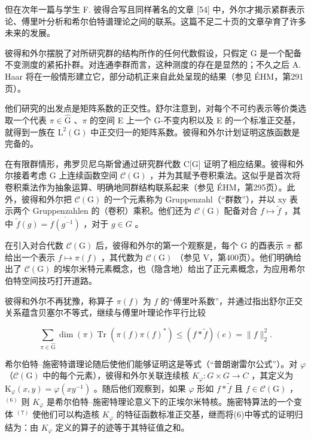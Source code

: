 但在次年一篇与学生 F. 彼得合写且同样著名的文章 {[}54{]} 中，外尔才揭示紧群表示论、傅里叶分析和希尔伯特谱理论之间的联系。这篇不足二十页的文章孕育了许多未来的发展。

彼得和外尔摆脱了对所研究群的结构所作的任何代数假设，只假定 G 是一个配备不变测度的紧拓扑群。对连通李群而言，这种测度的存在是显然的；不久之后 A. Haar 将在一般情形建立它，部分动机正来自此处呈现的结果（参见 ÉHM，第291页）。

他们研究的出发点是矩阵系数的正交性。舒尔注意到，对每个不可约表示等价类选取一个代表 \(\pi \in \widehat{\mathrm{G}}\) 、\(\pi\) 的空间 E 上一个 G-不变内积以及 E 的一个标准正交基，就得到一族在 \(\mathrm{L}^2 (\mathrm{G})\) 中正交归一的矩阵系数。彼得和外尔计划证明这族函数是完备的。

在有限群情形，弗罗贝尼乌斯曾通过研究群代数 C{[}G{]} 证明了相应结果。彼得和外尔接着考虑 G 上连续函数空间 \(\mathcal{C}(\mathrm{G})\) ，并为其赋予卷积乘法。这似乎是首次将卷积乘法作为抽象运算、明确地同群结构联系起来（参见 ÉHM，第295页）。此外，彼得和外尔把 \(\mathcal{C}(\mathrm{G})\) 的一个元素称为 Gruppenzahl（“群数”），并以 xy 表示两个 Gruppenzahlen 的（卷积）乘积。他们还为 \(\mathcal{C}(\mathrm{G})\) 配备对合 \(f \mapsto \widetilde{f}\) ，其中 \(\widetilde{f}(g) = \overline{f(g^{-1})}\) ，对于 \(g \in G\) 。

在引入对合代数 \(\mathcal{C}(\mathrm{G})\) 后，彼得和外尔的第一个观察是，每个 G 的酉表示 \(\pi\) 都给出一个表示 \(f \mapsto \pi(f)\) ，其代数为 \(\mathcal{C}(\mathrm{G})\) （参见 V，第400页）。他们明确给出了 \(\mathcal{C}(\mathrm{G})\) 的埃尔米特元素概念，也（隐含地）给出了正元素概念，为应用希尔伯特空间技巧打开道路。

彼得和外尔不再犹豫，称算子 \(\pi(f)\) 为 \(f\) 的“傅里叶系数”，并通过指出舒尔正交关系蕴含贝塞尔不等式，继续与傅里叶理论作平行比较

\[
\sum_ {\pi \in \widehat {\mathrm{G}}} \dim (\pi) \operatorname{Tr} (\pi (f) \pi (f) ^ {*}) \leqslant (f * \widetilde {f}) (e) = \| f \| _ {2} ^ {2}.\tag{6}
\]

希尔伯特--施密特谱理论随后使他们能够证明这是等式（“普朗谢雷尔公式”）。对 \(\varphi\) （\(\mathcal{C}(\mathrm{G})\) 中的每个元素），彼得和外尔关联连续核 \(K_{\varphi}\colon G\times G\to C\) ，其定义为 \(\mathrm{K}_{\varphi}(x,y)=\varphi(xy^{-1})\) 。随后他们观察到，如果 \(\varphi\) 形如 \(f*\widetilde{f}\) 且 \(f\in\mathcal{C}(\mathrm{G})\) ， \(^{(6)}\) 则 \(K_{\varphi}\) 是希尔伯特--施密特理论意义下的正埃尔米特核。施密特算法的一个变体 \(^{(7)}\) 使他们可以构造核 \(K_{\varphi}\) 的特征函数标准正交基，继而将(6)中等式的证明归结为：由 \(K_{\varphi}\) 定义的算子的迹等于其特征值之和。

